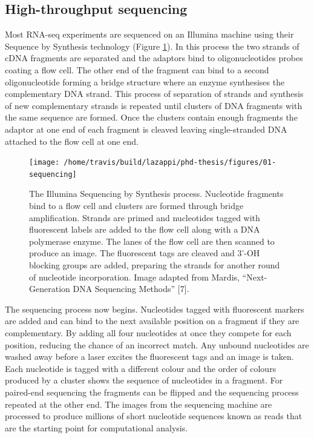 \documentclass[11pt,a4paper,titlepage,twoside,openright]{style/unimelbthesis}
\theoremstyle{definition}
\theoremstyle{definition}
\theoremstyle{definition}
\theoremstyle{remark}
\begin{document}
\begin{mainmatter}
\hypertarget{high-throughput-sequencing}{%
\subsection{High-throughput sequencing}\label{high-throughput-sequencing}}

Most RNA-seq experiments are sequenced on an Illumina machine using their Sequence by Synthesis technology (Figure \ref{fig:sequencing}). In this process the two strands of cDNA fragments are separated and the adaptors bind to oligonucleotides probes coating a flow cell. The other end of the fragment can bind to a second oligonucleotide forming a bridge structure where an enzyme synthesises the complementary DNA strand. This process of separation of strands and synthesis of new complementary strands is repeated until clusters of DNA fragments with the same sequence are formed. Once the clusters contain enough fragments the adaptor at one end of each fragment is cleaved leaving single-stranded DNA attached to the flow cell at one end.

\begin{figure}

{\centering \texttt{[image: /home/travis/build/lazappi/phd-thesis/figures/01-sequencing]} 

}

\caption[The Illumina Sequencing by Synthesis process.]{The Illumina Sequencing by Synthesis process. Nucleotide fragments bind to a flow cell and clusters are formed through bridge amplification. Strands are primed and nucleotides tagged with fluorescent labels are added to the flow cell along with a DNA polymerase enzyme. The lanes of the flow cell are then scanned to produce an image. The fluorescent tags are cleaved and 3'-OH blocking groups are added, preparing the strands for another round of nucleotide incorporation. Image adapted from Mardis, \enquote{Next-Generation DNA Sequencing Methods} {[}7{]}.}\label{fig:sequencing}
\end{figure}





The sequencing process now begins. Nucleotides tagged with fluorescent markers are added and can bind to the next available position on a fragment if they are complementary. By adding all four nucleotides at once they compete for each position, reducing the chance of an incorrect match. Any unbound nucleotides are washed away before a laser excites the fluorescent tags and an image is taken. Each nucleotide is tagged with a different colour and the order of colours produced by a cluster shows the sequence of nucleotides in a fragment. For paired-end sequencing the fragments can be flipped and the sequencing process repeated at the other end. The images from the sequencing machine are processed to produce millions of short nucleotide sequences known as reads that are the starting point for computational analysis.


\end{mainmatter}
\end{document}
